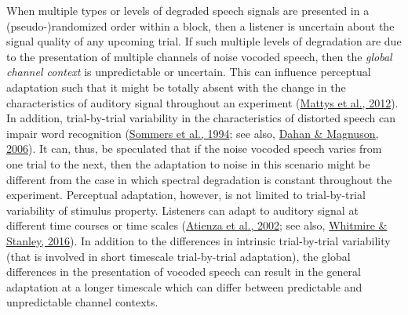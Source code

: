 \documentclass[a4paper, nobind]{templates/ociamthesis}
\begin{document}
When multiple types or levels of degraded speech signals are presented in a (pseudo-)randomized order within a block, then a listener is uncertain about the signal quality of any upcoming trial.
If such multiple levels of degradation are due to the presentation of multiple channels of noise vocoded speech, then the \emph{global channel context} is unpredictable or uncertain.
This can influence perceptual adaptation such that
it might be totally absent with the change in the characteristics of auditory signal throughout an experiment (\protect\hyperlink{ref-Mattys2012}{Mattys et al., 2012}).
In addition, trial-by-trial variability in the characteristics of distorted speech can impair word recognition (\protect\hyperlink{ref-Sommers1994}{Sommers et al., 1994}; see also, \protect\hyperlink{ref-Dahan2006}{Dahan \& Magnuson, 2006}).
It can, thus, be speculated that if the noise vocoded speech varies from one trial to the next, then the adaptation to noise in this scenario might be different from the case in which spectral degradation is constant throughout the experiment.
Perceptual adaptation, however, is not limited to trial-by-trial variability of stimulus property.
Listeners can adapt to auditory signal at different time courses or time scales (\protect\hyperlink{ref-Atienza2002}{Atienza et al., 2002}; see also, \protect\hyperlink{ref-Whitmire2016}{Whitmire \& Stanley, 2016}).
In addition to the differences in intrinsic trial-by-trial variability (that is involved in short timescale trial-by-trial adaptation),
the global differences in the presentation of vocoded speech can result in the general adaptation at a longer timescale
which can differ between predictable and unpredictable channel contexts.
\end{document}
